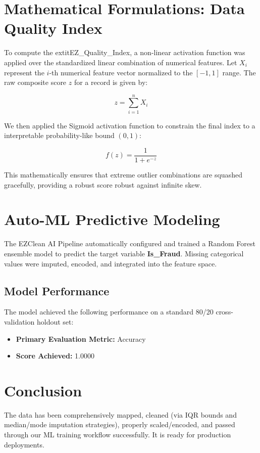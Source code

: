 \documentclass[12pt,a4paper]{article}
\begin{document}
\section{Mathematical Formulations: Data Quality Index}
To compute the 	extit{EZ\_Quality\_Index}, a non-linear activation function was applied over the standardized linear combination of numerical features. Let $X_i$ represent the $i$-th numerical feature vector normalized to the $[-1, 1]$ range. The raw composite score $z$ for a record is given by:

\begin{equation}
    z = \sum_{i=1}^{n} X_i
\end{equation}

We then applied the Sigmoid activation function to constrain the final index to a interpretable probability-like bound $(0, 1)$:

\begin{equation}
    f(z) = \frac{1}{1 + e^{-z}}
\end{equation}

This mathematically ensures that extreme outlier combinations are squashed gracefully, providing a robust score robust against infinite skew.


\section{Auto-ML Predictive Modeling}
The EZClean AI Pipeline automatically configured and trained a Random Forest ensemble model to predict the target variable \textbf{Is\_Fraud}. Missing categorical values were imputed, encoded, and integrated into the feature space.

\subsection{Model Performance}
The model achieved the following performance on a standard 80/20 cross-validation holdout set:
\begin{itemize}
    \item \textbf{Primary Evaluation Metric:} Accuracy
    \item \textbf{Score Achieved:} 1.0000
\end{itemize}

\section{{Conclusion}}
The data has been comprehensively mapped, cleaned (via IQR bounds and median/mode imputation strategies), properly scaled/encoded, and passed through our ML training workflow successfully. It is ready for production deployments.
\end{document}

